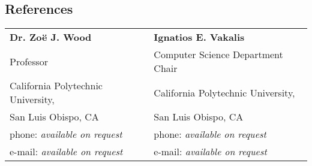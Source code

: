 \documentclass[margin,line]{resume}
\begin{document}
\begin{resume}
\section{\mysidestyle References}

\vspace{1mm} %
\begin{tabular}{@{}p{6cm}p{6cm}}
\textbf{Dr. Zo\"{e} J. Wood}            &  \textbf{Ignatios E. Vakalis}             \\
Professor                               &  Computer Science Department Chair        \\
California Polytechnic University,      &  California Polytechnic University,       \\
San Luis Obispo, CA                     &  San Luis Obispo, CA                      \\
phone: \textsl{available on request}    &  phone: \textsl{available on request}     \\
e-mail: \textsl{available on request}   &  e-mail: \textsl{available on request}    \\
\end{tabular}

\end{resume}
\end{document}
